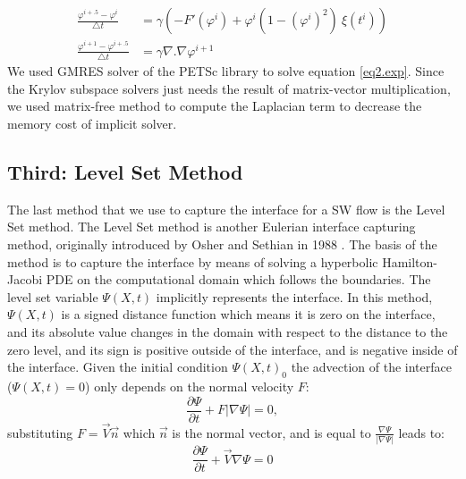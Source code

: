\documentclass[review]{elsarticle}
\begin{document}
\begin{align}
\frac{\varphi^{i+.5}-\varphi^i}{\bigtriangleup t}&= \gamma (-F'(\varphi^i)+\varphi^i (1-(\varphi^i)^2)\ \xi(t^i)) \label{eq1.exp}\\
\frac{\varphi^{i+1}-\varphi^{i+.5}}{\bigtriangleup t} &= \gamma \nabla .\nabla \varphi^{i+1} \label{eq2.exp}
\end{align}
We used GMRES solver of the PETSc \cite{petsc-user-ref} library to solve equation \eqref{eq2.exp}. Since the Krylov subspace solvers just needs the result of matrix-vector multiplication, we used matrix-free method to compute the Laplacian term to decrease the memory cost of implicit solver.
\subsection{Third: Level Set Method} \label{level set}
The last method that we use to capture the interface for a SW flow is the Level Set method.
The Level Set method is another Eulerian interface capturing method, originally introduced by Osher and Sethian in 1988 \cite{Osher1988}.
The basis of the method is to capture the interface by means of solving a hyperbolic Hamilton-Jacobi PDE on 
the computational domain which follows the boundaries. The level set variable $\varPsi (X,t)$ implicitly represents the interface. In this method, $\varPsi (X,t)$ is a signed distance function which means it is zero on the interface, and its absolute value changes in the domain with respect to the distance to the zero level, and its sign is positive outside of the interface, and is negative inside of the interface. 
Given the initial condition $\varPsi (X,t)_0$ the advection of the interface ($\varPsi (X,t)=0$) only depends on the normal velocity $F$:
\begin{equation}\label{levelseteq1}
        \frac{\partial \varPsi}{\partial t} + F |\nabla \varPsi| = 0,
\end{equation}
substituting $F = \overrightarrow{V} \overrightarrow{n} $ which  $\overrightarrow{n} $ is the normal vector, and is equal to
$ \frac{\nabla \varPsi}{|\nabla \varPsi|}$ leads to:
\begin{equation}\label{levelseteq2}
        \frac{\partial \varPsi}{\partial t} + \overrightarrow{V} \nabla \varPsi = 0
\end{equation}
\end{document}
